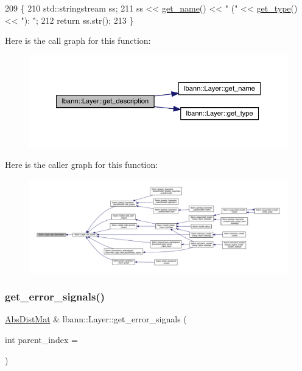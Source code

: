 \begin{DoxyCode}
209                                        \{
210   std::stringstream ss;
211   ss << \hyperlink{classlbann_1_1Layer_a80027550202fa7dbb1dd55fa8a66c84b}{get\_name}() << \textcolor{stringliteral}{" ("} << \hyperlink{classlbann_1_1Layer_a0fa0ea9160b490c151c0a17fde4f7239}{get\_type}() << \textcolor{stringliteral}{"): "};
212   \textcolor{keywordflow}{return} ss.str();
213 \}
\end{DoxyCode}
Here is the call graph for this function\+:\nopagebreak
\begin{figure}[H]
\begin{center}
\leavevmode
\includegraphics[width=350pt]{classlbann_1_1Layer_acc0803d3428914ca1eb5988c4309174a_cgraph}
\end{center}
\end{figure}
Here is the caller graph for this function\+:\nopagebreak
\begin{figure}[H]
\begin{center}
\leavevmode
\includegraphics[width=350pt]{classlbann_1_1Layer_acc0803d3428914ca1eb5988c4309174a_icgraph}
\end{center}
\end{figure}
\mbox{\label{classlbann_1_1Layer_adb561e140e0bb601f3c5a8ee053a71d2}} 
\subsubsection{\texorpdfstring{get\+\_\+error\+\_\+signals()}{get\_error\_signals()}\hspace{0.1cm}{\footnotesize\ttfamily [1/2]}}
{\footnotesize\ttfamily \hyperlink{base_8hpp_a9a697a504ae84010e7439ffec862b470}{Abs\+Dist\+Mat} \& lbann\+::\+Layer\+::get\+\_\+error\+\_\+signals (\begin{DoxyParamCaption}\item[{int}]{parent\+\_\+index = {} }\end{DoxyParamCaption})}

